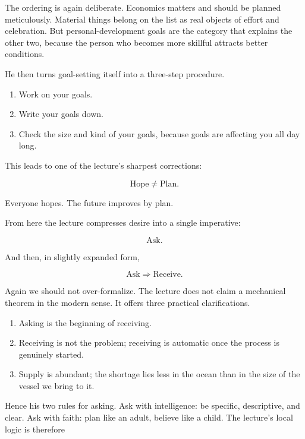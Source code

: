 The ordering is again deliberate. Economics matters and should be planned meticulously. Material things belong on the list as real objects of effort and celebration. But personal-development goals are the category that explains the other two, because the person who becomes more skillful attracts better conditions.

He then turns goal-setting itself into a three-step procedure.

\begin{enumerate}
\item Work on your goals.
\item Write your goals down.
\item Check the size and kind of your goals, because goals are affecting you all day long.
\end{enumerate}

This leads to one of the lecture's sharpest corrections:

\begin{equation}
\text{Hope} \neq \text{Plan}.
\end{equation}

Everyone hopes. The future improves by plan.

From here the lecture compresses desire into a single imperative:

\begin{equation}
\text{Ask}.
\end{equation}

And then, in slightly expanded form,

\begin{equation}
\text{Ask} \Longrightarrow \text{Receive}.
\end{equation}

Again we should not over-formalize. The lecture does not claim a mechanical theorem in the modern sense. It offers three practical clarifications.

\begin{enumerate}
\item Asking is the beginning of receiving.
\item Receiving is not the problem; receiving is automatic once the process is genuinely started.
\item Supply is abundant; the shortage lies less in the ocean than in the size of the vessel we bring to it.
\end{enumerate}

Hence his two rules for asking. Ask with intelligence: be specific, descriptive, and clear. Ask with faith: plan like an adult, believe like a child. The lecture's local logic is therefore

